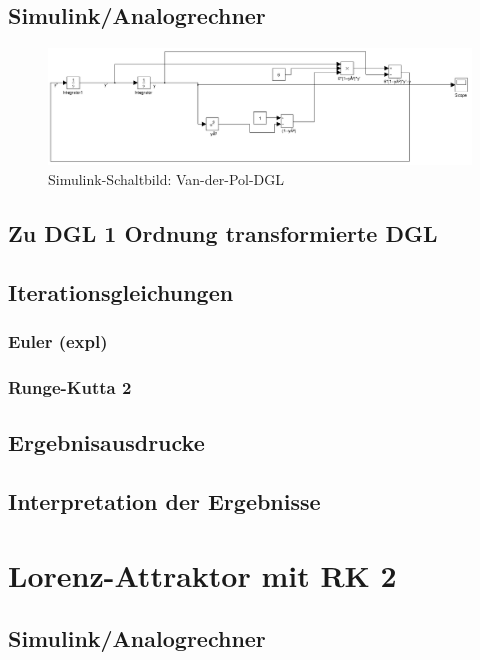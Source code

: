 \documentclass[10pt]{scrartcl}
\begin{document}
	\subsection{Simulink/Analogrechner}
	\begin{figure}[htbp]
	\centering
		\includegraphics[scale=0.4]{aufg2_a_simulink}
	\caption{Simulink-Schaltbild: Van-der-Pol-DGL}
	\label{fig:simulinkAufg2}
	\end{figure}	
	
	\subsection{Zu DGL 1 Ordnung transformierte DGL}
	
	\subsection{Iterationsgleichungen}
		\subsubsection{Euler (expl)}	
	
		\subsubsection{Runge-Kutta 2}	
		
	\subsection{Ergebnisausdrucke}	
		
	\subsection{Interpretation der Ergebnisse}	
	
\section{Lorenz-Attraktor mit RK 2}	
	\subsection{Simulink/Analogrechner}
	
\end{document}
